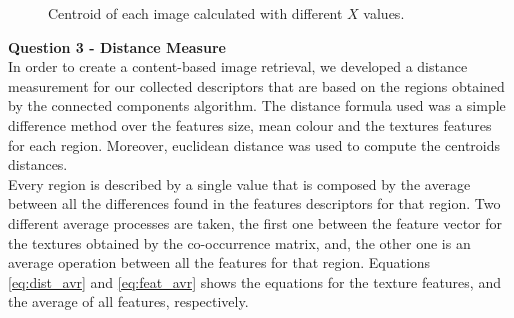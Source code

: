 \documentclass[12pt,a4paper]{article}
\begin{document}
\begin{figure}[!h]
{{		}
		\label{fig:cent10}
	}
	\quad
	\caption{Centroid of each image calculated with different $X$ values.}
	\label{fig:cent}
\end{figure}


\newpage

\textbf{\LARGE Question 3 - Distance Measure} \\

In order to create a content-based image retrieval, we developed a distance measurement for our collected descriptors that are based on the regions obtained by the connected components algorithm. The distance formula used was a simple difference method over the features size, mean colour and the textures features for each region. Moreover, euclidean distance was used to compute the centroids distances. \\

Every region is described by a single value that is composed by the average between all the differences found in the features descriptors for that region. Two different average processes are taken, the first one between the feature vector for the textures obtained by the co-occurrence matrix, and, the other one is an average operation between all the features for that region. Equations \ref{eq:dist_avr} and \ref{eq:feat_avr} shows the equations for the texture features, and the average of all features, respectively. \\
\end{document}
